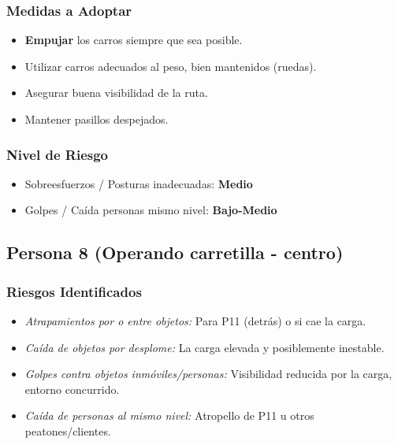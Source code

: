 \documentclass[12pt,a4paper]{article}
\begin{document}
	\subsubsection{Medidas a Adoptar}
	\begin{itemize}
		\item \textbf{Empujar} los carros siempre que sea posible.
		\item Utilizar carros adecuados al peso, bien mantenidos (ruedas).
		\item Asegurar buena visibilidad de la ruta.
		\item Mantener pasillos despejados.
	\end{itemize}
	
	\subsubsection{Nivel de Riesgo}
	\begin{itemize}
		\item Sobreesfuerzos / Posturas inadecuadas: \textbf{Medio}
		\item Golpes / Caída personas mismo nivel: \textbf{Bajo-Medio}
	\end{itemize}
	
	\bigskip\hrulefill\bigskip
	
	\subsection{Persona 8 (Operando carretilla - centro)}
	
	\subsubsection{Riesgos Identificados}
	\begin{itemize}
		\item \textit{Atrapamientos por o entre objetos:} Para P11 (detrás) o si cae la carga.
		\item \textit{Caída de objetos por desplome:} La carga elevada y posiblemente inestable.
		\item \textit{Golpes contra objetos inmóviles/personas:} Visibilidad reducida por la carga, entorno concurrido.
		\item \textit{Caída de personas al mismo nivel:} Atropello de P11 u otros peatones/clientes.
	\end{itemize}
	
\end{document}
